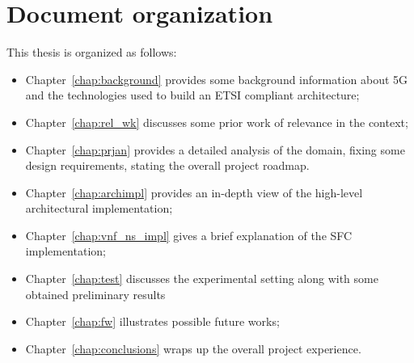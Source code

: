 \section*{Document organization}
 
This thesis is organized as follows:
\begin{itemize}
 \item Chapter~\ref{chap:background} provides some background information about
   5G and the technologies used to build an ETSI compliant architecture;
 \item Chapter~\ref{chap:rel_wk} discusses some prior work of relevance in the
   context;
 \item Chapter~\ref{chap:prjan} provides a detailed analysis of the domain,
   fixing some design requirements, stating the overall project roadmap.
 \item Chapter~\ref{chap:archimpl} provides an in-depth view of the high-level
   architectural implementation;
 \item Chapter~\ref{chap:vnf_ns_impl} gives a brief explanation of the SFC
   implementation;
 \item Chapter~\ref{chap:test} discusses the experimental setting along with
   some obtained preliminary results
 \item Chapter~\ref{chap:fw} illustrates possible future works;
 \item Chapter~\ref{chap:conclusions} wraps up the overall project experience.
\end{itemize}
